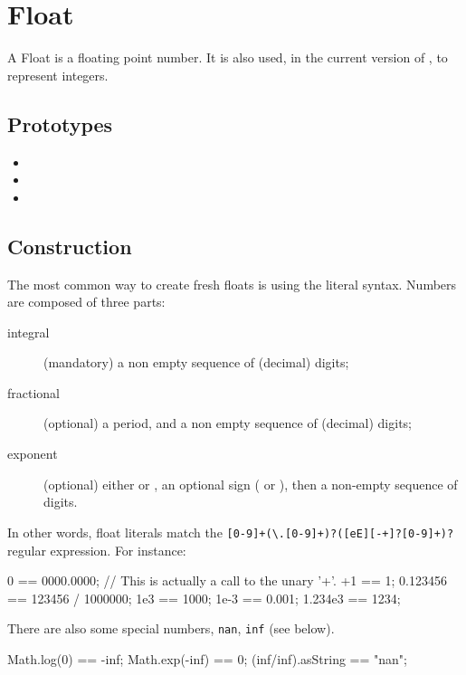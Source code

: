 \section{Float}

A Float is a floating point number.  It is also used, in the current
version of \us, to represent integers.

\subsection{Prototypes}

\begin{itemize}
\item {}
\item {}
\item {}
\end{itemize}

\subsection{Construction}
\label{sec:float:ctor}

The most common way to create fresh floats is using the literal
syntax.  Numbers are composed of three parts:
\begin{description}
\item[integral] (mandatory) a non empty sequence of (decimal) digits;
\item[fractional] (optional) a period, and a non empty sequence of
  (decimal) digits;
\item[exponent] (optional) either  or , an optional
  sign (\samp{+} or \samp{-}), then a non-empty sequence of digits.
\end{description}

In other words, float literals match the
\lstinline|[0-9]+(\.[0-9]+)?([eE][-+]?[0-9]+)?|
regular expression.  For instance:

\begin{urbiassert}
0 == 0000.0000;
// This is actually a call to the unary '+'.
+1 == 1;
0.123456 == 123456 / 1000000;
1e3 == 1000;
1e-3 == 0.001;
1.234e3 == 1234;
\end{urbiassert}

There are also some special numbers, \lstinline|nan|, \lstinline|inf|
(see below).

\begin{urbiassert}
Math.log(0) == -inf;
Math.exp(-inf) == 0;
(inf/inf).asString == "nan";
\end{urbiassert}


